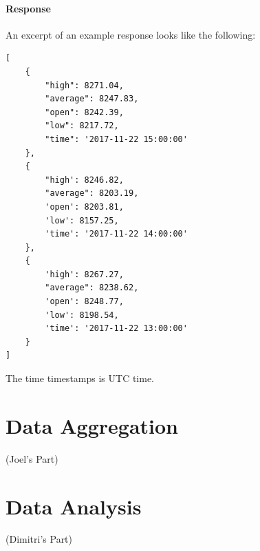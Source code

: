 \documentclass[a4paper,12pt]{article}
\begin{document}
\begin{spacing}{1.2}
\paragraph{Response}
An excerpt of an example response looks like the following:
\begin{lstlisting}
[
    {
        "high": 8271.04, 
        "average": 8247.83, 
        "open": 8242.39,
        "low": 8217.72, 
        "time": '2017-11-22 15:00:00'
    }, 
    {
        "high': 8246.82,
        "average": 8203.19,
        'open': 8203.81,
        'low': 8157.25,
        'time': '2017-11-22 14:00:00'
    }, 
    {
        'high': 8267.27, 
        "average": 8238.62, 
        'open': 8248.77, 
        'low': 8198.54, 
        'time': '2017-11-22 13:00:00'
    }
]
\end{lstlisting}


The time timestamps is UTC time.

\section{Data Aggregation}
(Joel's Part)
\section{Data Analysis}
(Dimitri's Part)


\end{spacing}
\clearpage

\printbibliography
\end{document}
